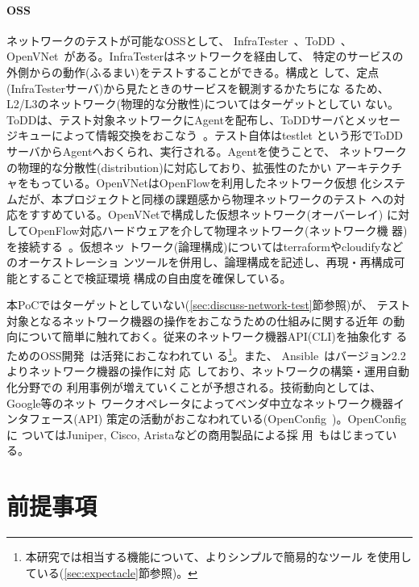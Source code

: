     \paragraph{OSS}
ネットワークのテストが可能なOSSとして、
InfraTester~\cite{infratester-github}、ToDD~\cite{todd-github}、
OpenVNet~\cite{openvnet-web}がある。InfraTesterはネットワークを経由して、
特定のサービスの外側からの動作(ふるまい)をテストすることができる。構成と
して、定点(InfraTesterサーバ)から見たときのサービスを観測するかたちにな
るため、L2/L3のネットワーク(物理的な分散性)についてはターゲットとしてい
ない。ToDDは、テスト対象ネットワークにAgentを配布し、ToDDサーバとメッセー
ジキューによって情報交換をおこなう~\cite{todd-blog}。テスト自体はtestlet
という形でToDDサーバからAgentへおくられ、実行される。Agentを使うことで、
ネットワークの物理的な分散性(distribution)に対応しており、拡張性のたかい
アーキテクチャをもっている。OpenVNetはOpenFlowを利用したネットワーク仮想
化システムだが、本プロジェクトと同様の課題感から物理ネットワークのテスト
への対応をすすめている。OpenVNetで構成した仮想ネットワーク(オーバーレイ)
に対してOpenFlow対応ハードウェアを介して物理ネットワーク(ネットワーク機
器)を接続する~\cite{openvnet-slide,network-testing-sdn-atmarkit}。仮想ネッ
トワーク(論理構成)についてはterraformやcloudifyなどのオーケストレーショ
ンツールを併用し、論理構成を記述し、再現・再構成可能とすることで検証環境
構成の自由度を確保している。

本PoCではターゲットとしていない(\ref{sec:discuss-network-test}節参照)が、
テスト対象となるネットワーク機器の操作をおこなうための仕組みに関する近年
の動向について簡単に触れておく。従来のネットワーク機器API(CLI)を抽象化す
るためのOSS開発~\cite{netmiko-github,napalm-github}は活発におこなわれてい
る\footnote{本研究では相当する機能について、よりシンプルで簡易的なツール
を使用している(\ref{sec:expectacle}節参照)。}。また、
Ansible~\cite{ansible-web}はバージョン2.2よりネットワーク機器の操作に対
応~\cite{ansible-22-news}しており、ネットワークの構築・運用自動化分野での
利用事例が増えていくことが予想される。技術動向としては、Google等のネット
ワークオペレータによってベンダ中立なネットワーク機器インタフェース(API)
策定の活動がおこなわれている(OpenConfig~\cite{openconfig})。OpenConfigに
ついてはJuniper, Cisco, Aristaなどの商用製品による採
用~\cite{openconfig-news}もはじまっている。

 \section{前提事項}
 \label{sec:premise}

